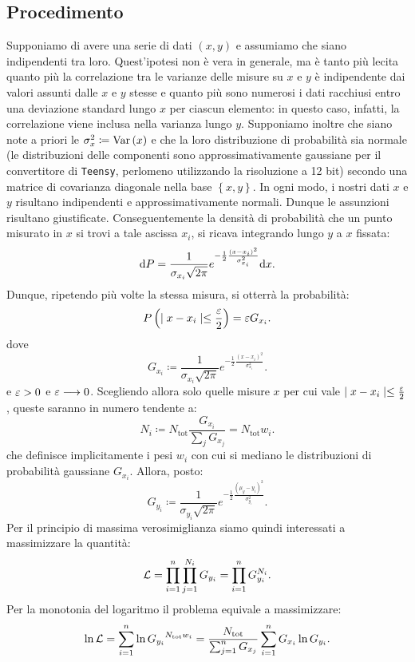 \documentclass{article}[a4paper, oneside, 11pt]
\begin{document}
\subsection{Procedimento}
Supponiamo di avere una serie di dati $(x, y)$ e assumiamo che siano
indipendenti tra loro. Quest'ipotesi non è vera in generale, ma
è tanto più lecita quanto più la correlazione tra le varianze delle misure su
$x$ e $y$ è indipendente dai valori assunti dalle $x$ e $y$ stesse e quanto più
sono numerosi i dati racchiusi entro una deviazione standard lungo $x$ per 
ciascun elemento: in questo caso, infatti, la correlazione viene inclusa nella
varianza lungo $y$.
Supponiamo inoltre che siano note a priori le $\sigma_x ^2 \coloneqq \text{Var}\left(x\right)$
e che la loro distribuzione di probabilità sia normale (le distribuzioni
delle componenti sono approssimativamente gaussiane per il convertitore
di \verb+Teensy+, perlomeno utilizzando la risoluzione a 12 bit) secondo una 
matrice
di covarianza diagonale nella base $\left\{x, y\right\}$.
In ogni modo, i nostri dati $x$ e $y$ risultano indipendenti e
approssimativamente normali. Dunque le assunzioni risultano giustificate. 
Conseguentemente la densità di probabilità che un punto misurato in $x$ si trovi
a tale ascissa $x_i$, si ricava integrando lungo $y$ a $x$ fissata:
\[
	\mathrm{d} P = \frac{1}{\sigma_{x_i} \sqrt{2\pi}}
	e^{-\frac{1}{2}{\frac{(x - x_i)^2}{\sigma_{x_i}^2}}} \mathrm{d} x
.\] 
Dunque, ripetendo più volte la stessa misura, si otterrà la probabilità:
\[
	P\left(\mid x - x_i \mid \leq \frac{\varepsilon}{2} \right) = \varepsilon G_{x_i} 
.\]
dove \[
	G_{x_i} \coloneqq \frac{1}{\sigma_{x_i} \sqrt{2\pi}}
	e^{-\frac{1}{2}{\frac{(x - x_i)^2}{\sigma_{x_i}^2}}}
.\] 
e $\varepsilon > 0$ e $\varepsilon \longrightarrow 0$. Scegliendo allora solo quelle misure $x$ per
cui vale $\mid x - x_i \mid \leq \frac{\varepsilon}{2}$, queste saranno in numero
tendente a:
\[
	N_i \coloneqq N_{\text{tot}} \frac{G_{x_i}}{\sum_j G_{x_j}} =
		N_{\text{tot}} w_i
.\] 
che definisce implicitamente i pesi $w_i$ con cui si mediano le distribuzioni
di probabilità gaussiane $G_{x_i}$.
Allora, posto:
\[
	G_{y_i} \coloneqq \frac{1}{\sigma_{y_i} \sqrt{2\pi}}
	e^{-\frac{1}{2}{\frac{(\mu_y - y_i)^2}{\sigma_{y_i}^2}}}
.\] 
Per il principio di massima verosimiglianza siamo quindi interessati a
massimizzare la quantità:%
\[
	\mathcal L = \prod_{i=1}^{n} \prod_{j=1}^{N_i} G_{y_i} = 
	\prod_{i=1}^{n} G_{y_i}^{N_i}
.\] 
Per la monotonia del logaritmo il problema equivale a massimizzare: 
\[
	\ln{\mathcal L} = \sum_{i=1}^{n}\ln{G_{y_i}}^{N_{\text{tot}}w_i} = 
	\frac{N_{\text{tot}}} {\sum_{j=1}^{n} G_{x_j}} 
	\sum_{i=1}^{n} G_{x_i} \ln{G_{y_i}}
.\] 
\end{document}

